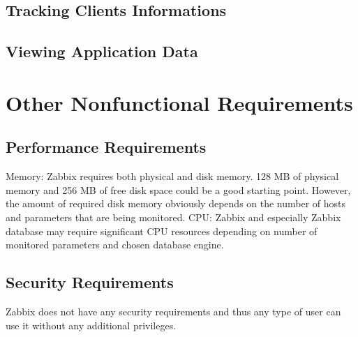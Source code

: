 \documentclass{article}
\begin{document}
\subsection{Tracking Clients Informations}

\subsection{Viewing Application Data}








\section{Other Nonfunctional Requirements}

\subsection{Performance Requirements}
Memory:
    Zabbix requires both physical and disk memory. 128 MB of physical memory and 256 MB of free disk space could be a good starting point. However, the amount of required disk memory obviously depends on the number of hosts and parameters that are being monitored.
CPU:
   Zabbix and especially Zabbix database may require significant CPU resources depending on number of monitored parameters and chosen database engine.
\subsection{Security Requirements}
Zabbix does not have any security requirements and thus any type of user can use it without any additional privileges.
\end{document}
